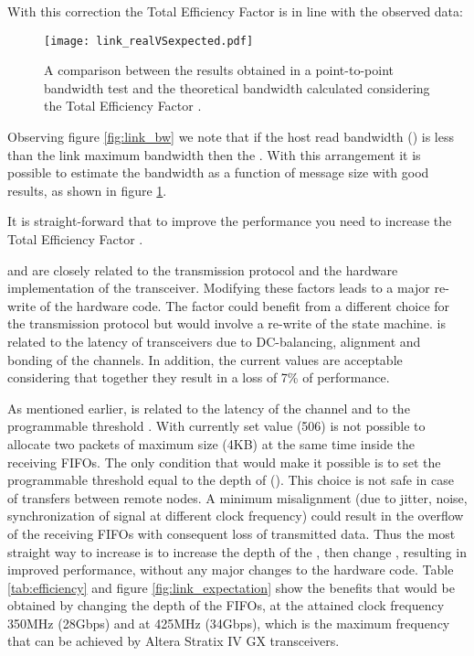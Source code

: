 With this correction the Total Efficiency Factor is in line with the
observed data:




\begin{figure}[!hbt]
  \centering
  \texttt{[image: link\_realVSexpected.pdf]}
  \caption{A comparison between the results obtained in a
  point-to-point bandwidth test and the theoretical bandwidth
  calculated considering the Total Efficiency Factor .}
  \label{fig:link_theory}
\end{figure}


Observing figure \ref{fig:link_bw} we note that if the host read
bandwidth () is less than the link maximum bandwidth
 then the .
With this arrangement it is possible to estimate the bandwidth as a
function of message size with good results, as shown in figure
\ref{fig:link_theory}.


It is straight-forward that to improve the  performance
you need to increase the Total Efficiency Factor .

 and  are closely related to the transmission protocol
and the hardware implementation of the transceiver. Modifying these
factors leads to a major re-write of the hardware code. The factor
 could benefit from a different choice for the transmission
protocol but would involve a re-write of the  state
machine.  is related to the latency of transceivers due to
DC-balancing, alignment and bonding of the channels. In addition, the
current values are acceptable considering that together they result in
a loss of 7\% of performance.


As mentioned earlier,  is related to the latency of the channel
and to the programmable threshold . With currently set value
(506) is not possible to allocate two packets of maximum size (4KB) at
the same time inside the receiving FIFOs. The only condition that
would make it possible is to set the programmable threshold equal to
the depth of  (). This choice
is not safe in case of transfers between remote nodes. A minimum
misalignment (due to jitter, noise, synchronization of signal at
different clock frequency) could result in the overflow of the
receiving FIFOs with consequent loss of transmitted data.
Thus the most straight way to increase  is to increase the
depth of the , then change , resulting in
improved performance, without any major changes to the hardware code.
Table \ref{tab:efficiency} and figure \ref{fig:link_expectation} show
the benefits that would be obtained by changing the depth of the
FIFOs, at the attained clock frequency 350MHz (28Gbps) and at 425MHz
(34Gbps), which is the maximum frequency that can be achieved by
Altera Stratix IV GX transceivers.

